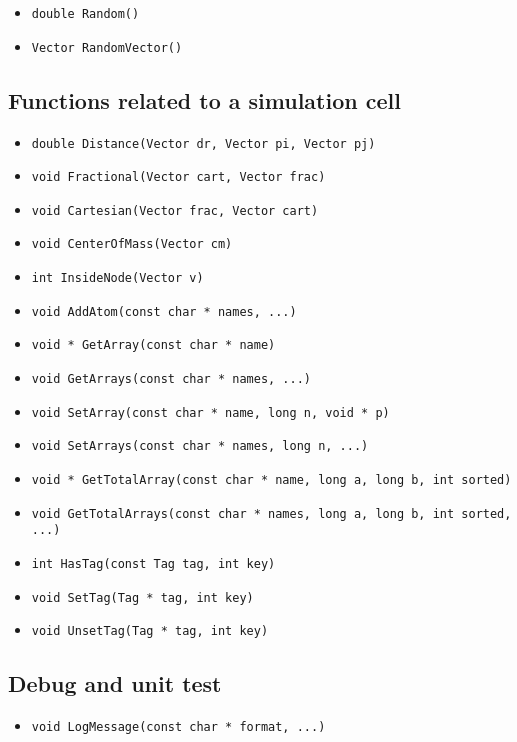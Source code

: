 \documentclass[a4paper,12pt]{article}
\begin{document}
\begin{itemize}
\item \verb'double Random()'
\item \verb'Vector RandomVector()'
\end{itemize}

\subsection{Functions related to a simulation cell}

\begin{itemize}
\item \verb'double Distance(Vector dr, Vector pi, Vector pj)'
\item \verb'void Fractional(Vector cart, Vector frac)'
\item \verb'void Cartesian(Vector frac, Vector cart)'
\item \verb'void CenterOfMass(Vector cm)'
\item \verb'int InsideNode(Vector v)'
\item \verb'void AddAtom(const char * names, ...)'
\item \verb'void * GetArray(const char * name)'
\item \verb'void GetArrays(const char * names, ...)'
\item \verb'void SetArray(const char * name, long n, void * p)'
\item \verb'void SetArrays(const char * names, long n, ...)'
\item \verb'void * GetTotalArray(const char * name, long a, long b, int sorted)'
\item \verb'void GetTotalArrays(const char * names, long a, long b, int sorted, ...)'
\item \verb'int HasTag(const Tag tag, int key)'
\item \verb'void SetTag(Tag * tag, int key)'
\item \verb'void UnsetTag(Tag * tag, int key)'
\end{itemize}

\subsection{Debug and unit test}

\begin{itemize}
\item \verb'void LogMessage(const char * format, ...)'
\end{itemize}
\end{document}
